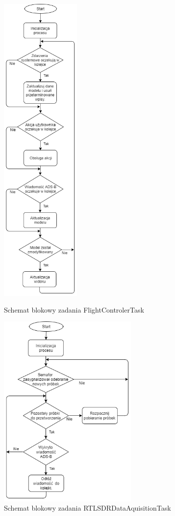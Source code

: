 \documentclass[eng,printmode]{mgr}
\begin{document}
\begin{figure}[htb]
\centering
\begin{minipage}[c]{0.35\linewidth}
\centering
\includegraphics[width=3.95cm]{plots/modelTask.png}
\caption{Schemat blokowy zadania FlightControlerTask}
\end{minipage}
\hfill
\begin{minipage}[c]{0.55\linewidth}
\centering
\vskip 2.5cm
\includegraphics[width=6.85cm]{plots/dataTask.png}
\vskip 3.55cm
\caption{Schemat blokowy zadania RTLSDRDataAquisitionTask}
\end{minipage}
\end{figure}
\newpage
\end{document}
